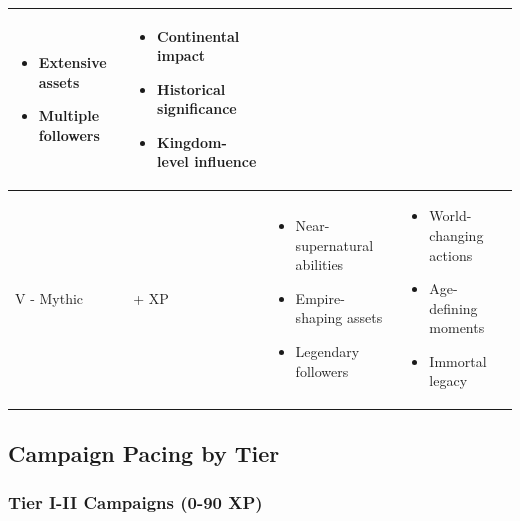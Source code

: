 \documentclass[11pt,letterpaper]{article}
\begin{document}
\begin{longtable}{|>{\centering\arraybackslash}p{2cm}|>{\centering\arraybackslash}p{2cm}|>{\raggedright\arraybackslash}p{4cm}|>{\raggedright\arraybackslash}p{4cm}|}
\begin{itemize}
    \item Extensive assets
    \item Multiple followers
\end{itemize} & 
\begin{itemize}
    \item Continental impact
    \item Historical significance
    \item Kingdom-level influence
\end{itemize} \\
\hline
V - Mythic & 221+ XP & 
\begin{itemize}
    \item Near-supernatural abilities
    \item Empire-shaping assets
    \item Legendary followers
\end{itemize} & 
\begin{itemize}
    \item World-changing actions
    \item Age-defining moments
    \item Immortal legacy
\end{itemize} \\
\hline
\end{longtable}

\subsection{Campaign Pacing by Tier}

\subsubsection{Tier I-II Campaigns (0-90 XP)}
\end{document}

